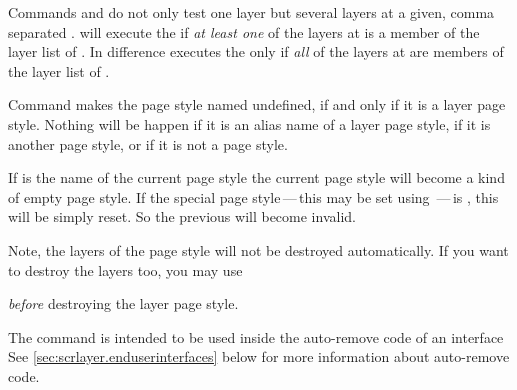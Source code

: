 Commands  and  do not
only test one layer but several layers at a given, comma separated
.  will execute the
 if \emph{at least one} of the layers at 
is a member of the layer list of . In difference
 executes the  only if \emph{all}
of the layers at  are members of the layer list of
.%
%
%

\begin{Declaration}
\end{Declaration}
%
Command  makes the page style named
 undefined, if and only if it is a layer page
style. Nothing will be happen if it is an alias name of a layer page style, if
it is another page style, or if it is not a page style. 

If  is the name of the current page style the current
page style will become a kind of empty page style. If the special page
style\,---\,this may be set using \,---\,is , this will be simply reset. So the previous
 will become invalid.

Note, the layers of the page style will not be destroyed
automatically. If you want to destroy the layers too, you may use
\begin{lstcode}[belowskip=\dp\strutbox]
\end{lstcode}
\emph{before} destroying the layer page style.

The command is intended to be used inside the auto-remove code of an interface
See \autoref{sec:scrlayer.enduserinterfaces} below for more information about
auto-remove code.%



